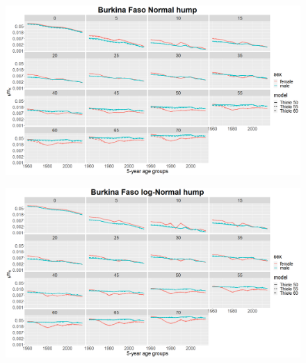 \documentclass[12pt,a4paper]{article}
\begin{document}
\newpage
\begin{figure}[H]
\includegraphics[width = \linewidth]{age mx normal.png}
\end{figure}
\begin{figure}[H]
\includegraphics[width = \linewidth]{age mx log-normal.png}
\end{figure}
\end{document}
